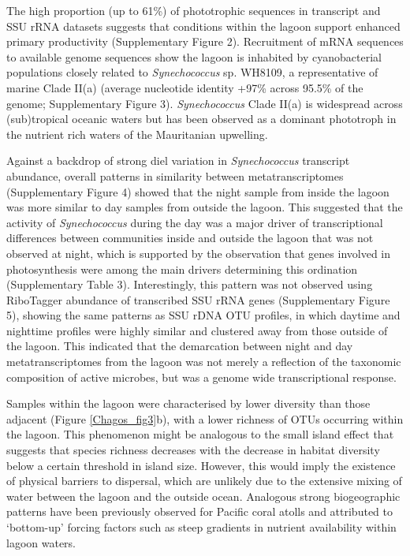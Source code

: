 The high proportion (up to 61\%) of phototrophic sequences in transcript and SSU rRNA datasets suggests that conditions within the lagoon support enhanced primary productivity (Supplementary Figure 2). Recruitment of mRNA sequences to available genome sequences show the lagoon is inhabited by cyanobacterial populations closely related to {\em Synechococcus} sp. WH8109, a representative of marine Clade II(a) (average nucleotide identity +97\% across 95.5\% of the genome; Supplementary Figure 3). {\em Synechococcus} Clade II(a) is widespread across (sub)tropical oceanic waters \cite{mazard2012dissecting, huang_novel_2012} but has been observed as a dominant phototroph in the nutrient rich waters of the Mauritanian upwelling. \cite{zwirglmaier_basin-scale_2007}

Against a backdrop of strong diel variation in {\em Synechococcus} transcript abundance, overall patterns in similarity between metatranscriptomes (Supplementary Figure 4) showed that the night sample from inside the lagoon was more similar to day samples from outside the lagoon. This suggested that the activity of {\em Synechococcus} during the day was a major driver of transcriptional differences between communities inside and outside the lagoon that was not observed at night, which is supported by the observation that genes involved in photosynthesis were among the main drivers determining this ordination (Supplementary Table 3). Interestingly, this pattern was not observed using RiboTagger abundance of transcribed SSU rRNA genes (Supplementary Figure 5), showing the same patterns as SSU rDNA OTU profiles, in which daytime and nighttime profiles were highly similar and clustered away from those outside of the lagoon. This indicated that the demarcation between night and day metatranscriptomes from the lagoon was not merely a reflection of the taxonomic composition of active microbes, but was a genome wide transcriptional response.

Samples within the lagoon were characterised by lower diversity than those adjacent (Figure \ref{Chagos_fig3}b), with a lower richness of OTUs occurring within the lagoon. This phenomenon might be analogous to the small island effect \cite{macarthur1967theory} that suggests that species richness decreases with the decrease in habitat diversity below a certain threshold in island size. However, this would imply the existence of physical barriers to dispersal, which are unlikely due to the extensive mixing of water between the lagoon and the outside ocean. Analogous strong biogeographic patterns have been previously observed for Pacific coral atolls and attributed to `bottom-up' forcing factors such as steep gradients in nutrient availability within lagoon waters. \cite{charpy_picophytoplankton_1999}

